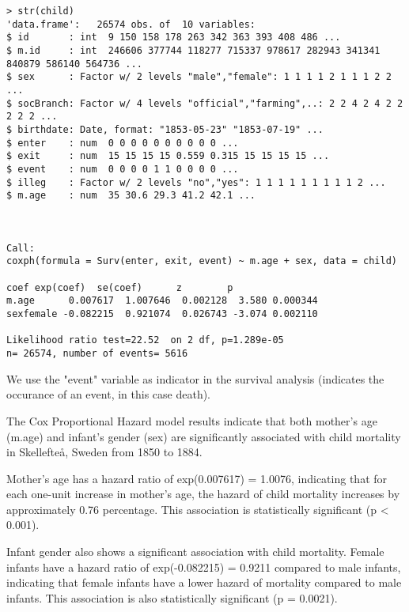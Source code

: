\documentclass[12pt,letterpaper]{article}
\begin{document}
\newpage	
\begin{verbatim}
> str(child)
'data.frame':	26574 obs. of  10 variables:
$ id       : int  9 150 158 178 263 342 363 393 408 486 ...
$ m.id     : int  246606 377744 118277 715337 978617 282943 341341 840879 586140 564736 ...
$ sex      : Factor w/ 2 levels "male","female": 1 1 1 1 2 1 1 1 2 2 ...
$ socBranch: Factor w/ 4 levels "official","farming",..: 2 2 4 2 4 2 2 2 2 2 ...
$ birthdate: Date, format: "1853-05-23" "1853-07-19" ...
$ enter    : num  0 0 0 0 0 0 0 0 0 0 ...
$ exit     : num  15 15 15 15 0.559 0.315 15 15 15 15 ...
$ event    : num  0 0 0 0 1 1 0 0 0 0 ...
$ illeg    : Factor w/ 2 levels "no","yes": 1 1 1 1 1 1 1 1 1 2 ...
$ m.age    : num  35 30.6 29.3 41.2 42.1 ...



Call:
coxph(formula = Surv(enter, exit, event) ~ m.age + sex, data = child)

coef exp(coef)  se(coef)      z        p
m.age      0.007617  1.007646  0.002128  3.580 0.000344
sexfemale -0.082215  0.921074  0.026743 -3.074 0.002110

Likelihood ratio test=22.52  on 2 df, p=1.289e-05
n= 26574, number of events= 5616 

\end{verbatim}	

We use the "event" variable as indicator in the survival analysis (indicates the occurance of an event, in this case death).


The Cox Proportional Hazard model results indicate that both mother's age (m.age) and infant's gender (sex) are significantly associated with child mortality in Skellefteå, Sweden from 1850 to 1884.

Mother's age has a hazard ratio of exp(0.007617) = 1.0076, indicating that for each one-unit increase in mother's age, the hazard of child mortality increases by approximately 0.76 percentage. This association is statistically significant (p < 0.001).

Infant gender also shows a significant association with child mortality. Female infants have a hazard ratio of exp(-0.082215) = 0.9211 compared to male infants, indicating that female infants have a lower hazard of mortality compared to male infants. This association is also statistically significant (p = 0.0021).
\end{document}

